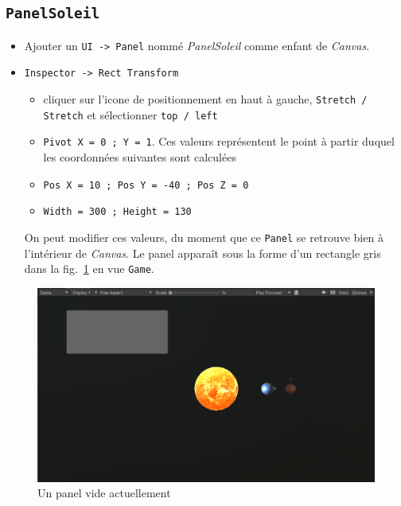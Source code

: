 \documentclass[a4paper,10pt]{article}
\newenvironment{solution}%
{\begin{tcolorbox}[breakable,colback=red!5!white,colframe=red!75!black,title=Solution]}%
{\end{tcolorbox}}
\begin{document}
\begin{solution}
\subsection{\texttt{PanelSoleil}}
\begin{itemize}
	\item Ajouter un \texttt{UI -> Panel} nommé \textit{PanelSoleil} comme enfant de \textit{Canvas}. 
	\item \texttt{Inspector -> Rect Transform}
	\begin{itemize}
		\item  cliquer sur l'icone de positionnement en haut à gauche, \texttt{Stretch / Stretch} et sélectionner \texttt{top / left}
	 \item \texttt{Pivot X = 0 ; Y = 1}. Ces valeurs représentent le point à partir duquel les coordonnées suivantes sont calculées
	\item \texttt{Pos X = 10 ; Pos Y = -40 ; Pos Z = 0}
	\item \texttt{Width = 300 ; Height = 130 }
	\end{itemize}	
	On peut modifier ces valeurs, du moment que ce \texttt{Panel} se retrouve bien à l'intérieur de \textit{Canvas}.	Le panel apparaît sous la forme d'un rectangle gris dans la fig.~\ref{fig:panelSoleil-1} en vue \texttt{Game}.
\end{itemize}
\end{solution}


\begin{figure}[h]
		\begin{center}
			\includegraphics[scale=.50]{fig/panelSoleil-1}
			\caption{Un panel vide actuellement}
			\label{fig:panelSoleil-1}
		\end{center}
\end{figure}
\end{document}
